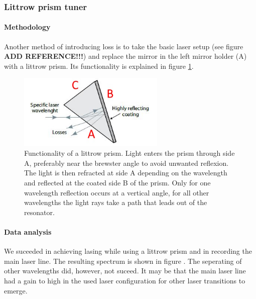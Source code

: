 \documentclass[../main.tex]{subfiles}
\begin{document}
\subsubsection{Littrow prism tuner}
    \paragraph{Methodology}
        Another method of introducing loss is to take the basic laser setup (see figure \textbf{ADD REFERENCE!!!}) and replace the mirror in the left mirror holder (A) with a littrow prism. Its functionality is explained in figure \ref{fig:5-FunktionsweiseLitrrowprisma}.

        \begin{figure}[H]
            \centering 
            \includegraphics[width = 7cm]{Bilddateien/5/5-FunktionsweiseLitrrowprisma.jpg}
            \caption{Functionality of a littrow prism. Light enters the prism through side A, preferably near the brewster angle to avoid unwanted reflexion. The light is then refracted at side A depending on the wavelength and reflected at the coated side B of the prism. Only for one wavelength reflection occurs at a vertical angle, for all other wavelengths the light rays take a path that leads out of the resonator.}
            \label{fig:5-FunktionsweiseLitrrowprisma}
        \end{figure}

    \paragraph{Data analysis}
        We suceeded in achieving lasing while using a littrow prism and in recording the main laser line. The resulting spectrum is shown in figure . The seperating of other wavelengths did, however, not suceed. It may be that the main laser line had a gain to high in the used laser configuration for other laser transitions to emerge.
\end{document}
